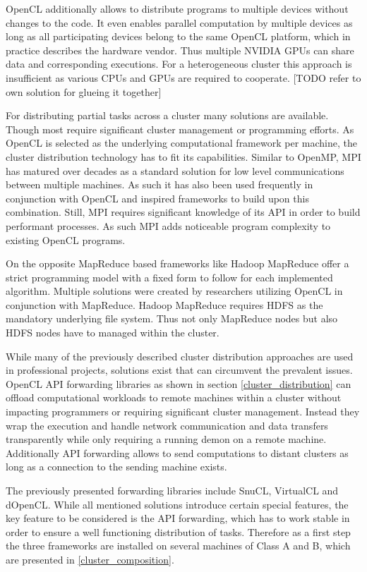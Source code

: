 OpenCL additionally allows to distribute programs to multiple devices without changes to the code. It even enables parallel computation by multiple devices as long as all participating devices belong to the same OpenCL platform, which in practice describes the hardware vendor. Thus multiple NVIDIA GPUs can share data and corresponding executions. For a heterogeneous cluster this approach is insufficient as various CPUs and GPUs are required to cooperate. 
[TODO refer to own solution for glueing it together]

For distributing partial tasks across a cluster many solutions are available. Though most require significant cluster management or programming efforts. As OpenCL is selected as the underlying computational framework per machine, the cluster distribution technology has to fit its capabilities.
Similar to OpenMP, MPI has matured over decades as a standard solution for low level communications between multiple machines. As such it has also been used frequently in conjunction with OpenCL and inspired frameworks to build upon this combination. Still, MPI requires significant knowledge of its API in order to build performant processes. As such MPI adds noticeable program complexity to existing OpenCL programs.

On the opposite MapReduce based frameworks like Hadoop MapReduce offer a strict programming model with a fixed form to follow for each implemented algorithm. Multiple solutions were created by researchers utilizing OpenCL in conjunction with MapReduce. Hadoop MapReduce requires HDFS as the mandatory underlying file system. Thus not only MapReduce nodes but also HDFS nodes have to managed within the cluster.

While many of the previously described cluster distribution approaches are used in professional projects, solutions exist that can circumvent the prevalent issues. OpenCL API forwarding libraries as shown in section \ref{cluster_distribution} can offload computational workloads to remote machines within a cluster without impacting programmers or requiring significant cluster management. Instead they wrap the execution and handle network communication and data transfers transparently while only requiring a running demon on a remote machine. Additionally API forwarding allows to send computations to distant clusters as long as a connection to the sending machine exists. 

The previously presented forwarding libraries include SnuCL, VirtualCL and dOpenCL. While all mentioned solutions introduce certain special features, the key feature to be considered is the API forwarding, which has to work stable in order to ensure a well functioning distribution of tasks. Therefore as a first step the three frameworks are installed on several machines of Class A and B, which are presented in \ref{cluster_composition}.

